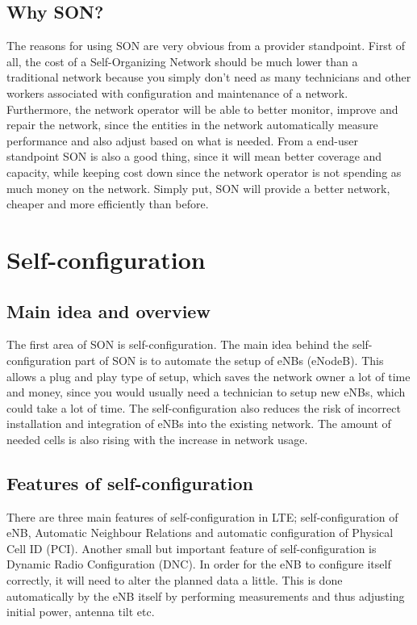 \documentclass{report}
\begin{document}
\section{Why SON?}
The reasons for using SON are very obvious from a provider standpoint. First of all, the cost of a Self-Organizing Network should be much lower than a traditional network because you simply don't need as many technicians and other workers associated with configuration and maintenance of a network. Furthermore, the network operator will be able to better monitor, improve and repair the network, since the entities in the network automatically measure performance and also adjust based on what is needed. From a end-user standpoint SON is also a good thing, since it will mean better coverage and capacity, while keeping cost down since the network operator is not spending as much money on the network. Simply put, SON will provide a better network, cheaper and more efficiently than before.
\chapter{Self-configuration}
\section{Main idea and overview}
The first area of SON is self-configuration. The main idea behind the self-configuration part of SON is to automate the setup of eNBs (eNodeB). This allows a plug and play type of setup, which saves the network owner a lot of time and money, since you would usually need a technician to setup new eNBs, which could take a lot of time.  
The self-configuration also reduces the risk of incorrect installation and integration of eNBs into the existing network. The amount of needed cells is also rising with the increase in network usage.

\section{Features of self-configuration}
There are three main features of self-configuration in LTE; self-configuration of eNB, Automatic Neighbour Relations and automatic configuration of Physical Cell ID (PCI). 
Another small but important feature of self-configuration is Dynamic Radio Configuration (DNC). 
In order for the eNB to configure itself correctly, it will need to alter the planned data a little. This is done automatically by the eNB itself by performing measurements and thus adjusting initial power, antenna tilt etc. %
\end{document}
